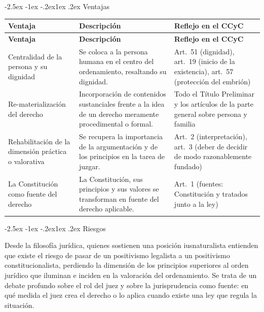 \documentclass[12pt,oneside]{book}
\makeatletter
\renewcommand\subsection{\@startsection{subsection}{2}{\z@}%
  {-2.5ex \@plus -1ex \@minus -.2ex}{1ex \@plus .2ex}%
  {\normalfont\normalsize\bfseries}}
\makeatother
\begin{document}
\subsection{Ventajas}

\begin{longtable}{@{}B{0.20\textwidth}L{0.34\textwidth}L{0.34\textwidth}@{}}
\toprule
\textbf{Ventaja} & \textbf{Descripción} & \textbf{Reflejo en el CCyC} \\
\midrule
\endfirsthead
\toprule
\textbf{Ventaja} & \textbf{Descripción} & \textbf{Reflejo en el CCyC} \\
\midrule
\endhead
\bottomrule
\endfoot
Centralidad de la persona y su dignidad & Se coloca a la persona humana en el centro del ordenamiento, resaltando su dignidad. & Art.~51 (dignidad), art.~19 (inicio de la existencia), art.~57 (protección del embrión) \\
Re-materialización del derecho & Incorporación de contenidos sustanciales frente a la idea de un derecho meramente procedimental o formal. & Todo el Título Preliminar y los artículos de la parte general sobre persona y familia \\
Rehabilitación de la dimensión práctica o valorativa & Se recupera la importancia de la argumentación y de los principios en la tarea de juzgar. & Art.~2 (interpretación), art.~3 (deber de decidir de modo razonablemente fundado) \\
La Constitución como fuente del derecho & La Constitución, sus principios y sus valores se transforman en fuente del derecho aplicable. & Art.~1 (fuentes: Constitución y tratados junto a la ley) \\
\end{longtable}

\subsection{Riesgos}

Desde la filosofía jurídica, quienes sostienen una posición iusnaturalista entienden que existe el riesgo de pasar de un positivismo legalista a un positivismo constitucionalista, perdiendo la dimensión de los principios superiores al orden jurídico que iluminan e inciden en la valoración del ordenamiento. Se trata de un debate profundo sobre el rol del juez y sobre la jurisprudencia como fuente: en qué medida el juez crea el derecho o lo aplica cuando existe una ley que regula la situación.
\end{document}
